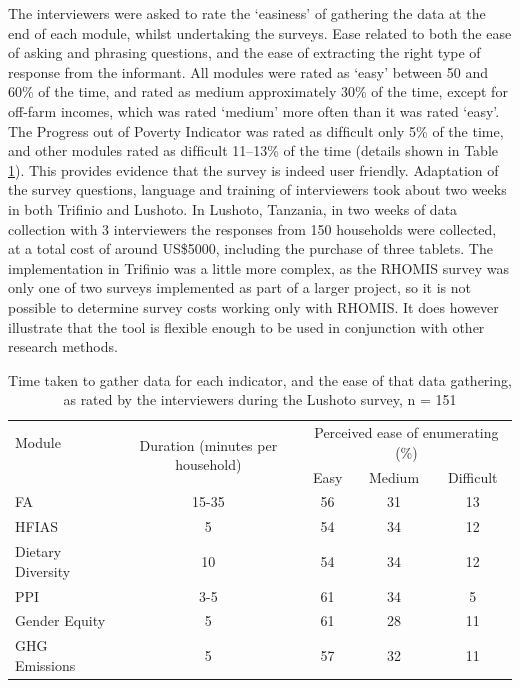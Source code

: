 The interviewers were asked to rate the `easiness' of gathering the data at the end of each module, whilst undertaking the surveys. Ease related to both the ease of asking and phrasing questions, and the ease of extracting the right type of response from the informant. All modules were rated as `easy' between 50 and 60\% of the time, and rated as medium approximately 30\% of the time, except for off-farm incomes, which was rated `medium' more often than it was rated `easy'. The Progress out of Poverty Indicator was rated as difﬁcult only 5\% of the time, and other modules rated as difﬁcult 11–13\% of the time (details shown in Table \ref{tab:02_1}). This provides evidence that the survey is indeed user friendly. Adaptation of the survey questions, language and training of interviewers took about two weeks in both Triﬁnio and Lushoto. In Lushoto, Tanzania, in two weeks of data collection with 3 interviewers the responses from 150 households were collected, at a total cost of around US\$5000, including the purchase of three tablets. The implementation in Triﬁnio was a little more complex, as the RHOMIS survey was only one of two surveys implemented as part of a larger project, so it is not possible to determine survey costs working only with RHOMIS. It does however illustrate that the tool is ﬂexible enough to be used in conjunction with other research methods.


\begin{table}[H]
   \caption{
    Time taken to gather data for each indicator, and the ease of that data gathering, as rated by the interviewers during the Lushoto survey, n = 151
  }
  \label{tab:02_1}
  \small
  \captionsetup{singlelinecheck = false, justification=justified} %
  \begin{tabular}{l c c c c}  %
    \toprule
    Module      & \multirow{2}{3.3cm}{Duration (minutes per household)}  & \multicolumn{3}{c}{Perceived ease of enumerating (\%)}\\ %
    \cmidrule{3-5}
     &   & Easy  & Medium & Difficult \\
    \midrule
      FA          &15-35 &56 &31 &13\\
      HFIAS           &5 &54 &34 &12\\
      Dietary Diversity         & 10 &54 &34 &12\\
      PPI        &3-5 &61 &34 &5\\
      Gender Equity           &5 &61 &28 &11\\
      GHG Emissions         &5 &57 &32 &11\\

    \bottomrule
  \end{tabular}
\end{table}

